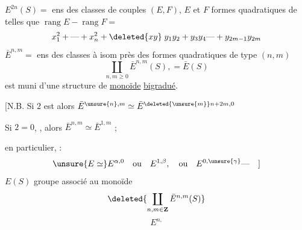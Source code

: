 $E^{2n}(S)=$ ens des classes de couples $(E,F)$, $E$ et $F$ formes quadratiques  de    telles que $\operatorname{rang}E-\operatorname{rang}F=$
\[
x_1^2+\text{---}+x_n^2+\deleted{xy}\;y_1y_2+y_3y_4\text{---}+y_{2m-1}y_{2m}
\]
$\bar E^{n,m}=$ ens des classes à isom près des formes quadratiques  de type $(n,m)$
\[
\coprod_{n,m\geq0}\bar E^{n,m}(S),=\bar E(S)
\]
est muni d’une structure de \uline{monoïde} \uline{bigradué}.

 [N.B. Si $2$ est  alors $\bar E^{\unsure{n},m}\simeq\bar E^{\deleted{\unsure{m}}n+2m,0}$

Si $2=0$, , alors $\bar E^{n,m}\simeq\bar E^{1,m}$ ;


en particulier,  : 
\[
\unsure{E\simeq}E^{\alpha,0}\quad\text{ou}\quad E^{1,\beta},\quad\text{ou}\quad E^{0,\unsure{\gamma}}\text{---}\quad]
\]
$E(S)$ groupe associé au monoïde
\[
\deleted{\coprod_{n,m\in\mathbf Z}\bar E^{n,m}(S)}
\]
\[
E^{n,}
\]
